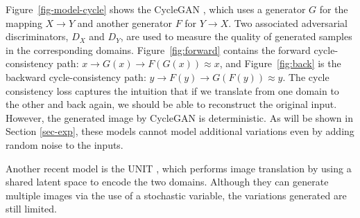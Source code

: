 \documentclass[conference]{IEEEtran}
\theoremstyle{definition}
\begin{document}
Figure~\ref{fig-model-cycle} shows the CycleGAN
\cite{zhu2017unpaired}, which uses a generator $G$ for the mapping $X\rightarrow Y$ and another generator $F$ for $Y\rightarrow X$. Two associated adversarial
discriminators, $D_X$ and $D_Y$, are used to measure the quality of generated samples in the corresponding domains. Figure~\ref{fig:forward}
contains the forward cycle-consistency path: $x\rightarrow G(x) \rightarrow F(G(x)) \approx x$, and Figure~\ref{fig:back} is the
backward cycle-consistency path: $y\rightarrow F(y)\rightarrow G(F(y))\approx y$. The cycle consistency loss captures the intuition that if
we translate from one domain to the other and back again, we should be able to reconstruct the original input. 
However, the generated image by CycleGAN
is
deterministic. As will be shown in Section \ref{sec-exp}, these models cannot model additional variations even by adding random noise to the
inputs. 


Another recent model is the UNIT \cite{liu2017unsupervised}, which performs image translation by using a shared latent space to encode
the two domains. Although they can generate multiple images via the use of a stochastic variable, the variations generated are still limited.



\end{document}
